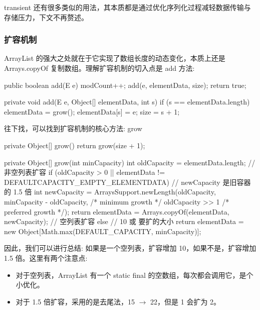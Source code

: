 transient 还有很多类似的用法，其本质都是通过优化序列化过程减轻数据传输与存储压力，下文不再赘述。

\subsubsection{扩容机制}


ArrayList 的强大之处就在于它实现了数组长度的动态变化，本质上还是 Arrays.copyOf 复制数组。理解扩容机制的切入点是 add 方法:

\begin{Java}
public boolean add(E e) {
    modCount++;
    add(e, elementData, size);
    return true;
}

private void add(E e, Object[] elementData, int s) {
    if (s == elementData.length)
        elementData = grow();
    elementData[s] = e;
    size = s + 1;
}
\end{Java}

往下找，可以找到扩容机制的核心方法: grow

\begin{Java}
private Object[] grow() {
    return grow(size + 1);
}

private Object[] grow(int minCapacity) {
    int oldCapacity = elementData.length;
    // 非空列表扩容
    if (oldCapacity > 0 || elementData != DEFAULTCAPACITY_EMPTY_ELEMENTDATA) {
        // newCapacity 是旧容器的 1.5 倍
        int newCapacity = ArraysSupport.newLength(oldCapacity,
                minCapacity - oldCapacity, /* minimum growth */
                oldCapacity >> 1           /* preferred growth */);
        return elementData = Arrays.copyOf(elementData, newCapacity);
    // 空列表扩容
    } else {
        // 10 或 要扩的大小
        return elementData = new Object[Math.max(DEFAULT_CAPACITY, minCapacity)];
    }
}
\end{Java}

因此，我们可以进行总结: 如果是一个空列表，扩容增加 10，如果不是，扩容增加 1.5 倍。这里有两个注意点:

\begin{itemize}
    \item 对于空列表，ArrayList 有一个 static final 的空数组，每次都会调用它，是个小优化。
    \item 对于 1.5 倍扩容，采用的是去尾法，15 $\rightarrow$ 22，但是 1 会扩为 2。
\end{itemize}

